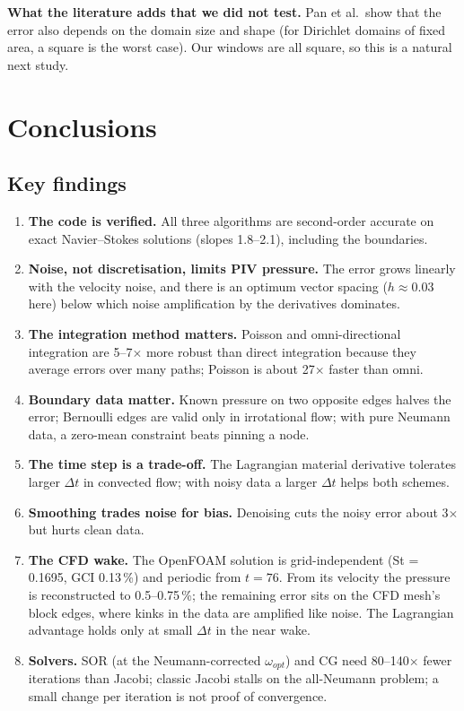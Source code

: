 \textbf{What the literature adds that we did not test.} Pan et al.\ show that the error also depends on the domain size and shape (for Dirichlet domains of fixed area, a square is the worst case). Our windows are all square, so this is a natural next study.

\chapter{Conclusions}

\section{Key findings}
\begin{enumerate}
\item \textbf{The code is verified.} All three algorithms are second-order accurate on exact Navier--Stokes solutions (slopes 1.8--2.1), including the boundaries.
\item \textbf{Noise, not discretisation, limits PIV pressure.} The error grows linearly with the velocity noise, and there is an optimum vector spacing ($h\approx0.03$ here) below which noise amplification by the derivatives dominates.
\item \textbf{The integration method matters.} Poisson and omni-directional integration are 5--7$\times$ more robust than direct integration because they average errors over many paths; Poisson is about 27$\times$ faster than omni.
\item \textbf{Boundary data matter.} Known pressure on two opposite edges halves the error; Bernoulli edges are valid only in irrotational flow; with pure Neumann data, a zero-mean constraint beats pinning a node.
\item \textbf{The time step is a trade-off.} The Lagrangian material derivative tolerates larger $\Delta t$ in convected flow; with noisy data a larger $\Delta t$ helps both schemes.
\item \textbf{Smoothing trades noise for bias.} Denoising cuts the noisy error about 3$\times$ but hurts clean data.
\item \textbf{The CFD wake.} The OpenFOAM solution is grid-independent (St = 0.1695, GCI 0.13\,\%) and periodic from $t=76$. From its velocity the pressure is reconstructed to 0.5--0.75\,\%; the remaining error sits on the CFD mesh's block edges, where kinks in the data are amplified like noise. The Lagrangian advantage holds only at small $\Delta t$ in the near wake.
\item \textbf{Solvers.} SOR (at the Neumann-corrected $\omega_{opt}$) and CG need 80--140$\times$ fewer iterations than Jacobi; classic Jacobi stalls on the all-Neumann problem; a small change per iteration is not proof of convergence.
\end{enumerate}

